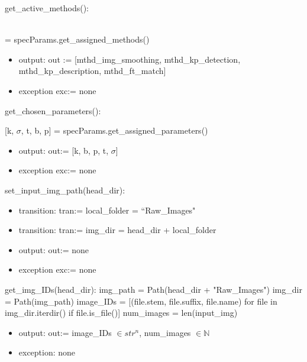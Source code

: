 \documentclass[12pt, titlepage]{article}
\begin{document}
\noindent get\_active\_methods():

 \\ = specParams.get\_assigned\_methods() 
\begin{itemize}
  \item output: out := [mthd\_img\_smoothing, mthd\_kp\_detection, 
  mthd\_kp\_description, mthd\_ft\_match]
  \item exception exc:= none
\end{itemize}


\noindent get\_chosen\_parameters(): 

[k, $\sigma$, t, b, p] = specParams.get\_assigned\_parameters()


\begin{itemize}
  \item output: out:= [k, b, p, t,  $\sigma$]
  \item exception exc:= none
\end{itemize}


\noindent set\_input\_img\_path(head\_dir):
\begin{itemize}
  \item transition: tran:= local\_folder = ``Raw\_Images"
  \item transition: tran:= img\_dir = head\_dir + local\_folder
\end{itemize}
\begin{itemize}
  \item output: out:= none
  \item exception exc:= none
\end{itemize}


\noindent get\_img\_IDs(head\_dir): \newline \newline
img\_path = Path(head\_dir + "Raw\_Images") \newline
img\_dir = Path(img\_path) \newline
image\_IDs = [(file.stem, file.suffix, file.name) 
for file in img\_dir.iterdir() if file.is\_file()] \newline
num\_images = len(input\_img)
\begin{itemize}
\item output: out:= image\_IDs $\in str^{n}$, num\_images $\in \mathbb{N}$
\item exception: none 
\end{itemize}
\end{document}
